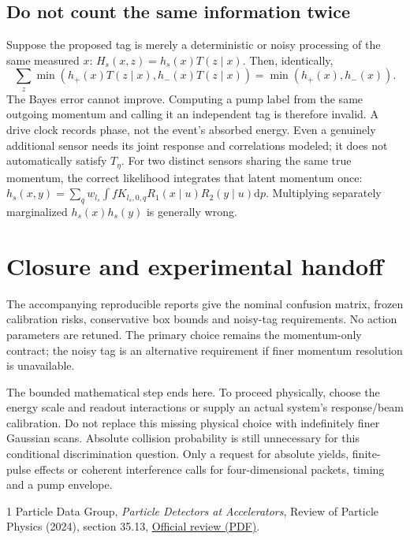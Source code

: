 \documentclass[11pt,a4paper]{article}
\newcommand{\dd}{\mathrm d}
\begin{document}
\subsection*{Do not count the same information twice}
Suppose the proposed tag is merely a deterministic or noisy processing
of the same measured $x$: $H_s(x,z)=h_s(x)T(z\mid x)$.
Then, identically,
\begin{equation}
 \sum_z\min(h_+(x)T(z\mid x),h_-(x)T(z\mid x))
 =\min(h_+(x),h_-(x)).
\end{equation}
The Bayes error cannot improve. Computing a pump label from the same
outgoing momentum and calling it an independent tag is therefore
invalid. A drive clock records phase, not the event's absorbed energy.
Even a genuinely additional sensor needs its joint response and
correlations modeled; it does not automatically satisfy $T_\eta$.
For two distinct sensors sharing the same true momentum, the correct
likelihood integrates that latent momentum once:
$h_s(x,y)=\sum_qw_{l_s}\int fK_{l_s,0,q}R_1(x\mid u)R_2(y\mid u)\dd p$.
Multiplying separately marginalized $h_s(x)h_s(y)$ is generally wrong.

\section{Closure and experimental handoff}
The accompanying reproducible reports give the nominal confusion
matrix, frozen calibration risks, conservative box bounds and noisy-tag
requirements. No action parameters are retuned. The primary choice
remains the momentum-only contract; the noisy tag is an alternative
requirement if finer momentum resolution is unavailable.

The bounded mathematical step ends here. To proceed physically, choose
the energy scale and readout interactions or supply an actual system's
response/beam calibration. Do not replace this missing physical choice
with indefinitely finer Gaussian scans. Absolute collision probability
is still unnecessary for this conditional discrimination question.
Only a request for absolute yields, finite-pulse effects or coherent
interference calls for four-dimensional packets, timing and a pump
envelope.

\begin{thebibliography}{1}
 Particle Data Group, \emph{Particle Detectors at
Accelerators}, Review of Particle Physics (2024), section 35.13,
\href{https://pdg.lbl.gov/2024/reviews/rpp2024-rev-particle-detectors-accel.pdf}
{Official review (PDF)}.
\end{thebibliography}
\end{document}
